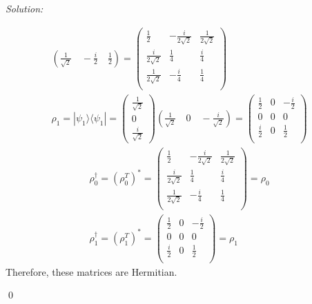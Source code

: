 \documentclass[12pt,a4paper]{article}
\newenvironment{sol}
    {\emph{Solution:}
    }
    {
    \qed
    }
\begin{document}
\begin{sol}
\begin{itemize}
\begin{gather}
(\frac{1}{\sqrt{2}}\quad-\frac{i}{2}\quad\frac{1}{2})
=
\left(\begin{array}{ccc}
\frac{1}{2}&-\frac{i}{2\sqrt{2}}&\frac{1}{2\sqrt{2}}\\
\frac{i}{2\sqrt{2}}&\frac{1}{4}&\frac{i}{4}\\
\frac{1}{2\sqrt{2}}&-\frac{i}{4}&\frac{1}{4}\\
\end{array}\right)\\
\rho_1=|\psi_1\rangle\langle\psi_1|=
\left(\begin{array}{c}
\frac{1}{\sqrt{2}}\\
0\\
\frac{i}{\sqrt{2}}
\end{array}\right)
(\frac{1}{\sqrt{2}}\quad0\quad-\frac{i}{\sqrt{2}})
=
\left(\begin{array}{ccc}
\frac{1}{2}&0&-\frac{i}{2}\\
0&0&0\\
\frac{i}{2}&0&\frac{1}{2}\\
\end{array}\right)
\end{gather}
\begin{gather}
\rho_0^{\dagger}=(\rho_0^T)^*=
\left(\begin{array}{ccc}
\frac{1}{2}&-\frac{i}{2\sqrt{2}}&\frac{1}{2\sqrt{2}}\\
\frac{i}{2\sqrt{2}}&\frac{1}{4}&\frac{i}{4}\\
\frac{1}{2\sqrt{2}}&-\frac{i}{4}&\frac{1}{4}\\
\end{array}\right)
=\rho_0\\
\rho_1^{\dagger}=(\rho_1^T)^*=
\left(\begin{array}{ccc}
\frac{1}{2}&0&-\frac{i}{2}\\
0&0&0\\
\frac{i}{2}&0&\frac{1}{2}\\
\end{array}\right)
=\rho_1
\end{gather}
Therefore, these matrices are Hermitian.
\end{itemize}
\end{sol}
\end{document}
